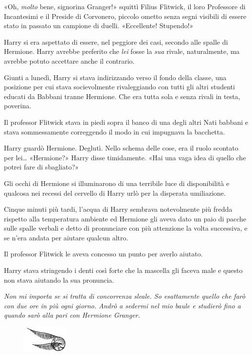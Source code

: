 «Oh, \textit{molto} bene, signorina Granger!» squittì Filius Flitwick, il loro Professore di Incantesimi e il Preside di Corvonero, piccolo ometto senza segni visibili di essere stato in passato un campione di duelli. «Eccellente! Stupendo!»

Harry si era aspettato di essere, nel peggiore dei casi, secondo alle spalle di Hermione. Harry avrebbe preferito che \textit{lei} fosse la \textit{sua} rivale, naturalmente, ma avrebbe potuto accettare anche il contrario.

Giunti a lunedì, Harry si stava indirizzando verso il fondo della classe, una posizione per cui stava socievolmente rivaleggiando con tutti gli altri studenti educati da Babbani tranne Hermione. Che era tutta sola e senza rivali in testa, poverina.

Il professor Flitwick stava in piedi sopra il banco di una degli altri Nati babbani e stava sommessamente correggendo il modo in cui impugnava la bacchetta.

Harry guardò Hermione. Deglutì. Nello schema delle cose, era il ruolo scontato per lei… «Hermione?» Harry disse timidamente. «Hai una vaga idea di quello che potrei fare di sbagliato?»

Gli occhi di Hermione si illuminarono di una terribile luce di disponibilità e qualcosa nei recessi del cervello di Harry urlò per la disperata umiliazione.

Cinque minuti più tardi, l’acqua di Harry sembrava notevolmente più fredda rispetto alla temperatura ambiente ed Hermione gli aveva dato un paio di pacche sulle spalle verbali e detto di pronunciare con più attenzione la volta successiva, e se n’era andata per aiutare qualcun altro.

Il professor Flitwick le aveva concesso un punto per averlo aiutato.

Harry stava stringendo i denti così forte che la mascella gli faceva male e questo non stava aiutando la sua pronuncia.

\textit{Non mi importa se si tratta di concorrenza sleale. So esattamente quello che farò con due ore in più ogni giorno. Andrò a sedermi nel mio baule e studierò fino a quando sarò alla pari con Hermione Granger.}

\begin{figure}[h!]
        \includegraphics[scale=0.4]{boccino.png}
        \centering
\end{figure}

